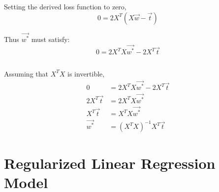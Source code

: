 \documentclass{article}
\begin{document}
\subsection{}
Setting the derived loss function to zero,
$$0 = 2 X^T (X \vec{w} - \vec{t}) $$
{Thus $\vec{w^*}$ must satisfy: \\
$$ 0 = 2 X^T X \vec{w^*} - 2 X^T \vec{t}$$


\subsection{}
Assuming that $X^T X$ is invertible,
\begin{align*}
0 &= 2 X^T X \vec{w^*} - 2 X^T \vec{t} \\
2 X^T \vec{t} &= 2 X^T X \vec{w^*} \\
X^T \vec{t} &= X^T X \vec{w^*}  \\
 \vec{w^*} &= (X^T X)^{-1} X^T \vec{t} 
\end{align*}



\section{Regularized Linear Regression Model}

}
\end{document}
